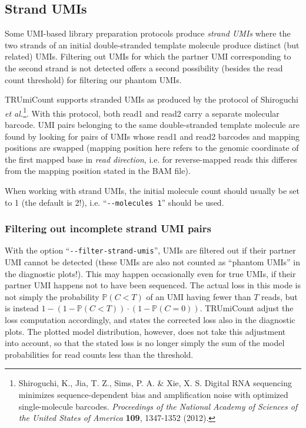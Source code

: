 \documentclass[10pt]{article}
\newcommand{\ddarg}[1]{\texttt{-{}-#1}}
\begin{document}
\pagebreak
\subsection{Strand UMIs}\label{strand-umis}

Some UMI-based library preparation protocols produce \emph{strand UMIs} where the two strands of an initial double-stranded template molecule produce distinct (but related) UMIs. Filtering out UMIs for which the partner UMI corresponding to the second strand is not detected offers a second possibility (besides the read count threshold) for filtering our phantom UMIs.

TRUmiCount supports stranded UMIs as produced by the protocol of Shiroguchi \textit{et al.}\footnote{Shiroguchi, K., Jia, T. Z., Sims, P. A. \& Xie, X. S. Digital RNA sequencing minimizes sequence-dependent bias and amplification noise with optimized single-molecule barcodes. \textit{Proceedings of the National Academy of Sciences of the United States of America} \textbf{109}, 1347-1352 (2012).}. With this protocol, both read1 and read2 carry a separate molecular barcode. UMI pairs belonging to the same double-stranded template molecule are found by looking for pairs of UMIs whose read1 and read2 barcodes and mapping positions are swapped (mapping position here refers to the genomic coordinate of the first mapped base in \emph{read direction}, i.e. for reverse-mapped reads this differes from the mapping position stated in the BAM file).

When working with strand UMIs, the initial molecule count should usually be set to 1 (the default is 2!), i.e. ``\ddarg{molecules 1}'' should be used.

\subsubsection*{Filtering out incomplete strand UMI pairs}

With the option ``\ddarg{filter-strand-umis}'', UMIs are filtered out if their partner UMI cannot be detected (these UMIs are also not counted as ``phantom UMIs'' in the diagnostic plots!). This may happen occasionally even for true UMIs, if their partner UMI happens not to have been sequenced. The actual loss in this mode is not simply the probability $\mathbb{P}(C < T)$ of an UMI having fewer than $T$ reads, but is instead $1 - (1 - \mathbb{P}(C < T))\cdot (1 - \mathbb{P}(C=0))$. TRUmiCount adjust the loss computation accordingly, and states the corrected loss also in the diagnostic plots. The plotted model distribution, however, does not take this adjustment into account, so that the stated loss is no longer simply the sum of the model probabilities for read counts less than the threshold.
\end{document}
